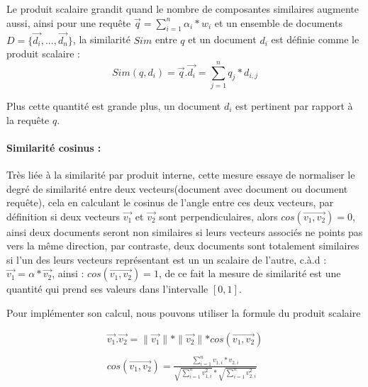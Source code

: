 \documentclass[12pt]{report}
\begin{document}
			
			\par 
			Le produit scalaire grandit quand le nombre de composantes similaires augmente aussi, ainsi pour une
			requête $\vec{q} = \sum_{i=1}^{n} \alpha_i*w_i$ et un ensemble de documents
			$D = \lbrace\vec{d_i},...,\vec{d_n}\rbrace$, la similarité $Sim$ entre $q$ et un document $d_i$ est
			définie comme le produit scalaire : 
			\[
				Sim(q,d_i) = \vec{q} . \vec{d_i} = \sum_{j=1}^{n} q_j * d_{i,j}
			\]
			\par 
			Plus cette quantité est grande plus, un document $d_i$ est pertinent par rapport à la requête $q$.
			
			
			\paragraph{Similarité cosinus :}
			Très liée à la similarité par produit interne, cette mesure essaye de normaliser le degré de 
			similarité entre deux vecteurs(document avec document ou document requête), cela en calculant 
			le cosinus de l'angle entre ces deux vecteurs, par définition si deux vecteurs $\vec{v_1}$ 
			et $\vec{v_2}$ sont perpendiculaires, alors $ cos(\overrightarrow{v_1,v_2}) = 0$, ainsi deux documents
			seront non similaires si leurs vecteurs associés ne points pas vers la même direction, par 
			contraste, deux documents sont totalement similaires si l'un des leurs vecteurs représentant
			est un un scalaire de l'autre, c.à.d : $\vec{v_1} = \alpha * \vec{v_2}$, ainsi :
			$ cos(\overrightarrow{v_1,v_2}) = 1$, de ce fait la mesure de similarité est une quantité 
			qui prend ses valeurs dans l'intervalle $[0,1]$.\par 
			Pour implémenter son calcul, nous pouvons utiliser la formule du produit scalaire
			
			\begin{equation*}
				\begin{gathered}
				\vec{v_1}.\vec{v_2} = \parallel \vec{v_1}\parallel * \parallel \vec{v_2} \parallel  * cos(\overrightarrow{v_1,v_2}) \\\\
				cos(\overrightarrow{v_1,v_2}) = \frac{\sum_{i=1}^{n} v_{1,i} * v_{2,i} }
													{\sqrt{\sum_{i=1}^{n} v_{1,i}^2} * \sqrt{\sum_{i=1}^{n} v_{2,i}^2} }
				\end{gathered}
			\end{equation*}
			
			
\end{document}
